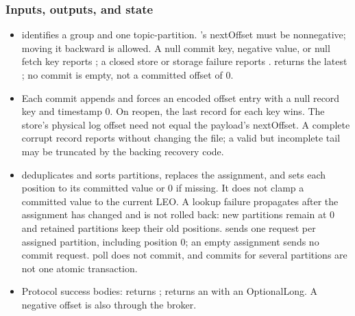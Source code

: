 \subsubsection*{Inputs, outputs, and state}
\begin{itemize}
\item {} identifies a group and one topic-partition. 's nextOffset must be nonnegative; moving it backward is allowed. A null commit key, negative value, or null fetch key reports ; a closed store or storage failure reports .  returns the latest ; no commit is empty, not a committed offset of 0.
\item Each commit appends and forces an encoded offset entry with a null record key and timestamp 0. On reopen, the last record for each key wins. The store's physical log offset need not equal the payload's nextOffset. A complete corrupt record reports  without changing the file; a valid but incomplete tail may be truncated by the backing recovery code.
\item {} deduplicates and sorts partitions, replaces the assignment, and sets each position to its committed value or 0 if missing. It does not clamp a committed value to the current LEO. A lookup failure propagates after the assignment has changed and is not rolled back: new partitions remain at 0 and retained partitions keep their old positions.  sends one request per assigned partition, including position 0; an empty assignment sends no commit request. poll does not commit, and commits for several partitions are not one atomic transaction.
\item Protocol success bodies:  returns ;  returns an  with an OptionalLong. A negative offset is also  through the broker.
\end{itemize}
